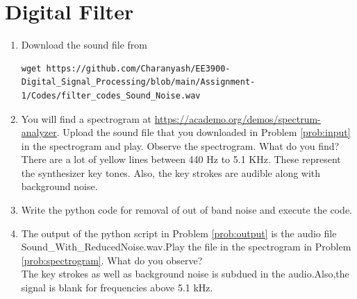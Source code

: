 \documentclass[journal,12pt,twocolumn]{IEEEtran}
\renewcommand\thesection{\arabic{section}}
\begin{document}
\section{Digital Filter}
\begin{enumerate}[label=\thesection.\arabic*
,ref=\thesection.\theenumi]
\item
\label{prob:input}
Download the sound file from  
\begin{lstlisting}
wget https://github.com/Charanyash/EE3900-Digital_Signal_Processing/blob/main/Assignment-1/Codes/filter_codes_Sound_Noise.wav
\end{lstlisting}
\item
\label{prob:spectrogram}
You will find a spectrogram at \href{https://academo.org/demos/spectrum-analyzer}{\url{https://academo.org/demos/spectrum-analyzer}}. 
%
Upload the sound file that you downloaded in Problem \ref{prob:input} in the spectrogram  and play.  Observe the spectrogram. What do you find?
\\
%
\solution There are a lot of yellow lines between 440 Hz to 5.1 KHz.  These represent the synthesizer key tones. Also, the key strokes
are audible along with background noise.
\item
\label{prob:output}
Write the python code for removal of out of band noise and execute the code.
\\
\solution

%
\item
The output of the python script in Problem \ref{prob:output} is the audio file  Sound\_With\_ReducedNoise.wav.Play the file in the spectrogram in Problem \ref{prob:spectrogram}. What do you observe?
\\
\solution The key strokes as well as background noise is subdued in the audio.Also,the signal is blank for frequencies above 5.1 kHz.
\end{enumerate}
\end{document}
